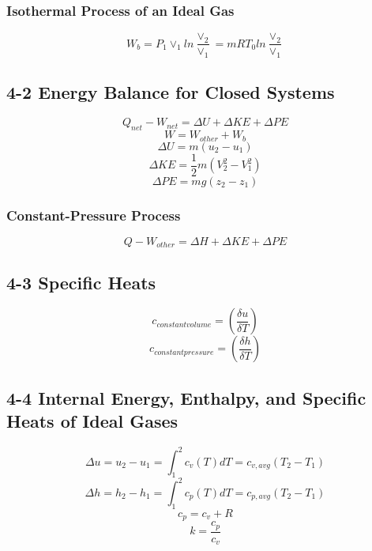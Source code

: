 \documentclass[10pt,landscape]{article}
\begin{document}
\begin{multicols}{3}
\subsubsection{Isothermal Process of an Ideal Gas}
\begin{equation}
    W_b=P_1\vee_1ln\frac{\vee_2}{\vee_1}=mRT_0ln\frac{\vee_2}{\vee_1}
\end{equation}
\subsection{4-2 Energy Balance for Closed Systems}
\begin{equation}
    Q_{net}-W_{net}=\Delta U + \Delta KE + \Delta PE
\end{equation}
\begin{equation}
    W=W_{other}+W_b
\end{equation}
\begin{equation}
    \Delta U = m(u_2-u_1)
\end{equation}
\begin{equation}
    \Delta KE = \frac{1}{2}m(V^2_2-V_1^2)
\end{equation}
\begin{equation}
    \Delta PE = mg(z_2-z_1)
\end{equation}
\subsubsection{Constant-Pressure Process}
\begin{equation}
    Q-W_{other}=\Delta H+\Delta KE + \Delta PE
\end{equation}
\subsection{4-3 Specific Heats}
\begin{equation}
    c_{constant volume}=(\frac{\delta u}{\delta T})
\end{equation}
\begin{equation}
    c_{constant pressure}=(\frac{\delta h}{\delta T})
\end{equation}
\subsection{4-4 Internal Energy, Enthalpy, and Specific Heats of Ideal Gases}
\begin{equation}
    \Delta u=u_2-u_1=\int^2_1c_v(T)dT=c_{v,avg}(T_2-T_1)
\end{equation}
\begin{equation}
    \Delta h=h_2-h_1=\int^2_1c_p(T)dT=c_{p,avg}(T_2-T_1)
\end{equation}
\begin{equation}
    c_p=c_v+R
\end{equation}
\begin{equation}
    k=\frac{c_p}{c_v}
\end{equation}

\end{multicols}
\end{document}
